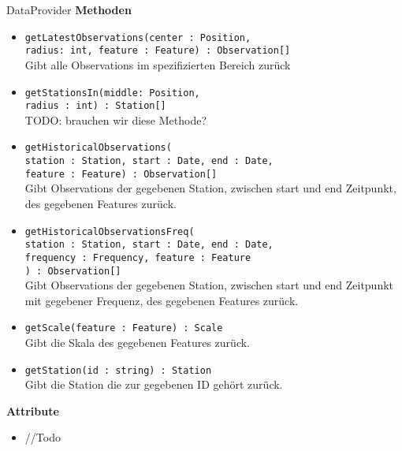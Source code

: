 \begin{Class}{DataProvider}
    \textbf{Methoden}
    \begin{itemize}
        \item \texttt{getLatestObservations(center : Position,
        \\radius: int, feature : Feature) : Observation[]}
        \\Gibt alle Observations im spezifizierten Bereich zurück
        \item \texttt{getStationsIn(middle: Position,
        \\radius : int) : Station[]}
        \\TODO: brauchen wir diese Methode?
        \item \texttt{getHistoricalObservations(
            \\station : Station, start : Date, end : Date,
            \\feature : Feature) : Observation[]}
        \\Gibt Observations der gegebenen Station, zwischen start und end Zeitpunkt, des gegebenen Features zurück.
        \item \texttt{getHistoricalObservationsFreq(
            \\station : Station, start : Date, end : Date,
            \\frequency : Frequency, feature : Feature
            \\) : Observation[]}
        \\Gibt Observations der gegebenen Station, zwischen start und end Zeitpunkt mit gegebener Frequenz, des gegebenen Features zurück.
        \item \texttt{getScale(feature : Feature) : Scale}
        \\Gibt die Skala des gegebenen Features zurück.
        \item \texttt{getStation(id : string) : Station}
        \\Gibt die Station die zur gegebenen ID gehört zurück.
    \end{itemize}
    
    \textbf{Attribute}
    \begin{itemize}
        \item //Todo
    \end{itemize}
\end{Class}

